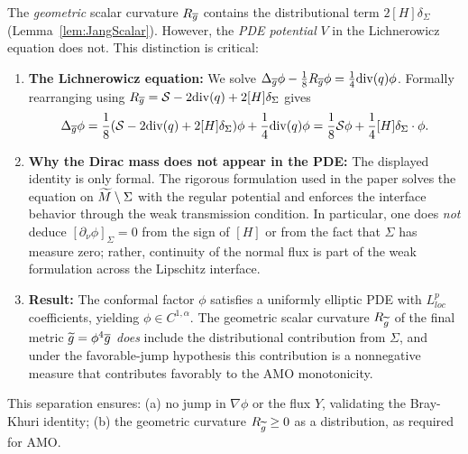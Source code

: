 \begin{remark}\label{rem:PDEvsCurvature}
The \emph{geometric} scalar curvature $R_{\overline{g}}$ contains the distributional term $2[H]\delta_\Sigma$ (Lemma~\ref{lem:JangScalar}). However, the \emph{PDE potential} $V$ in the Lichnerowicz equation does not. This distinction is critical:

\begin{enumerate}
    \item \textbf{The Lichnerowicz equation:} We solve $\Delta_{\overline{g}}\phi - \frac{1}{8}R_{\overline{g}}\phi = \frac{1}{4}\mathrm{div}(q)\phi$. Formally rearranging using $R_{\overline{g}} = \mathcal{S} - 2\mathrm{div}(q) + 2[H]\delta_\Sigma$ gives
    \[
        \Delta_{\overline{g}}\phi = \frac{1}{8}(\mathcal{S} - 2\mathrm{div}(q) + 2[H]\delta_\Sigma)\phi + \frac{1}{4}\mathrm{div}(q)\phi = \frac{1}{8}\mathcal{S}\phi + \frac{1}{4}[H]\delta_\Sigma \cdot \phi.
    \]
    
    \item \textbf{Why the Dirac mass does not appear in the PDE:} The displayed identity is only formal. The rigorous formulation used in the paper solves the equation on $\widetilde{M} \setminus \Sigma$ with the regular potential and enforces the interface behavior through the weak transmission condition. In particular, one does \emph{not} deduce $[\partial_\nu\phi]_\Sigma=0$ from the sign of $[H]$ or from the fact that $\Sigma$ has measure zero; rather, continuity of the normal flux is part of the weak formulation across the Lipschitz interface.
    
    \item \textbf{Result:} The conformal factor $\phi$ satisfies a uniformly elliptic PDE with $L^p_{loc}$ coefficients, yielding $\phi \in C^{1,\alpha}$. The geometric scalar curvature $R_{\widetilde{g}}$ of the final metric $\widetilde{g} = \phi^4\overline{g}$ \emph{does} include the distributional contribution from $\Sigma$, and under the favorable-jump hypothesis this contribution is a nonnegative measure that contributes favorably to the AMO monotonicity.
\end{enumerate}

This separation ensures: (a) no jump in $\nabla\phi$ or the flux $Y$, validating the Bray-Khuri identity; (b) the geometric curvature $R_{\widetilde{g}} \ge 0$ as a distribution, as required for AMO.
\end{remark}

